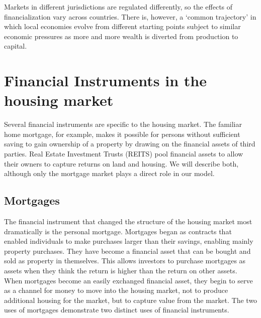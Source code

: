 Markets in different jurisdictions are regulated differently, so the effects of financialization vary across countries. There is, however, a ‘common trajectory’ \cite{hayCommonTrajectoriesVariable2004} \cite{aalbersConversationLandRent2018} in which local economies evolve from different starting points subject to similar economic pressures as more and more wealth is diverted from production to capital.




\section{Financial Instruments in the housing market}
Several financial instruments are specific to the housing market. The familiar home mortgage, for example, makes it possible for persons without sufficient saving to gain ownership of a property by drawing on the financial assets of third parties. Real Estate Investment Trusts (REITS) pool financial assets to allow their owners to capture returns on land and housing. We will describe both, although only the mortgage market plays a direct role in our model. 



\subsection{Mortgages}


The financial instrument that changed the structure of the housing market most dramatically is the personal mortgage. Mortgages began as contracts that enabled individuals to make purchases larger than their savings, enabling mainly property purchases. They have become a financial asset that can be bought and sold as property in themselves. This allows investors to purchase mortgages as assets when they think the return is higher than the return on other assets.  When mortgages become an easily exchanged financial asset, they begin to serve as a channel for money to move into the housing market, not to produce additional housing for the market, but to capture value from the market. The two uses of mortgages demonstrate two distinct uses of financial instruments.  

